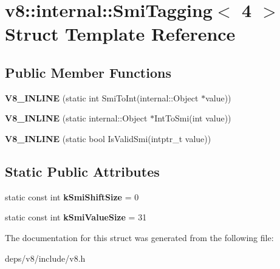 \hypertarget{structv8_1_1internal_1_1_smi_tagging_3_014_01_4}{}\section{v8\+:\+:internal\+:\+:Smi\+Tagging$<$ 4 $>$ Struct Template Reference}
\label{structv8_1_1internal_1_1_smi_tagging_3_014_01_4}
\subsection*{Public Member Functions}
\begin{DoxyCompactItemize}
\item 
\hypertarget{structv8_1_1internal_1_1_smi_tagging_3_014_01_4_ab68c5c5fa7a1624f847b641c2fa20a65}{}{\bfseries V8\+\_\+\+I\+N\+L\+I\+N\+E} (static int Smi\+To\+Int(internal\+::\+Object $\ast$value))\label{structv8_1_1internal_1_1_smi_tagging_3_014_01_4_ab68c5c5fa7a1624f847b641c2fa20a65}

\item 
\hypertarget{structv8_1_1internal_1_1_smi_tagging_3_014_01_4_ac6458dc30a64d46a97852221ce253e3a}{}{\bfseries V8\+\_\+\+I\+N\+L\+I\+N\+E} (static internal\+::\+Object $\ast$Int\+To\+Smi(int value))\label{structv8_1_1internal_1_1_smi_tagging_3_014_01_4_ac6458dc30a64d46a97852221ce253e3a}

\item 
\hypertarget{structv8_1_1internal_1_1_smi_tagging_3_014_01_4_a5fe826ffe53c81e2d8ae0b49fc3813bb}{}{\bfseries V8\+\_\+\+I\+N\+L\+I\+N\+E} (static bool Is\+Valid\+Smi(intptr\+\_\+t value))\label{structv8_1_1internal_1_1_smi_tagging_3_014_01_4_a5fe826ffe53c81e2d8ae0b49fc3813bb}

\end{DoxyCompactItemize}
\subsection*{Static Public Attributes}
\begin{DoxyCompactItemize}
\item 
\hypertarget{structv8_1_1internal_1_1_smi_tagging_3_014_01_4_a4230f8d72054619f8141d0524733d8e9}{}static const int {\bfseries k\+Smi\+Shift\+Size} = 0\label{structv8_1_1internal_1_1_smi_tagging_3_014_01_4_a4230f8d72054619f8141d0524733d8e9}

\item 
\hypertarget{structv8_1_1internal_1_1_smi_tagging_3_014_01_4_a0857bbaab799b39a51f578744bf855f8}{}static const int {\bfseries k\+Smi\+Value\+Size} = 31\label{structv8_1_1internal_1_1_smi_tagging_3_014_01_4_a0857bbaab799b39a51f578744bf855f8}

\end{DoxyCompactItemize}


The documentation for this struct was generated from the following file\+:\begin{DoxyCompactItemize}
\item 
deps/v8/include/v8.\+h\end{DoxyCompactItemize}
